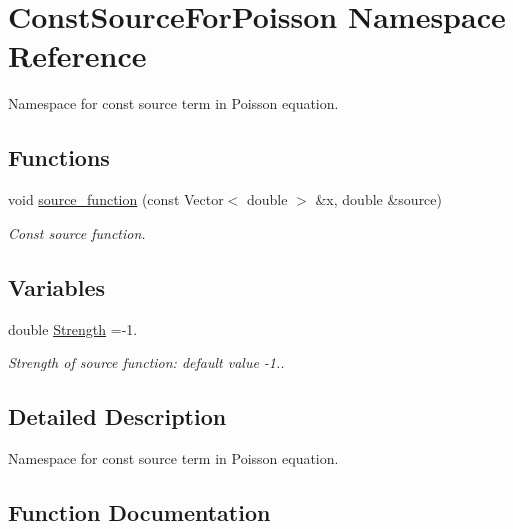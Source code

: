 \hypertarget{namespaceConstSourceForPoisson}{}\section{Const\+Source\+For\+Poisson Namespace Reference}
\label{namespaceConstSourceForPoisson}


Namespace for const source term in Poisson equation.  


\subsection*{Functions}
\begin{DoxyCompactItemize}
\item 
void \hyperlink{namespaceConstSourceForPoisson_aeaa1153817bde9598372b803342f3299}{source\+\_\+function} (const Vector$<$ double $>$ \&x, double \&source)
\begin{DoxyCompactList}\small\item\em Const source function. \end{DoxyCompactList}\end{DoxyCompactItemize}
\subsection*{Variables}
\begin{DoxyCompactItemize}
\item 
double \hyperlink{namespaceConstSourceForPoisson_add351c5acab2561d68d1fc9ec3d5fc5e}{Strength} =-\/1.
\begin{DoxyCompactList}\small\item\em Strength of source function\+: default value -\/1.. \end{DoxyCompactList}\end{DoxyCompactItemize}


\subsection{Detailed Description}
Namespace for const source term in Poisson equation. 

\subsection{Function Documentation}
\mbox{\label{namespaceConstSourceForPoisson_aeaa1153817bde9598372b803342f3299}} 
